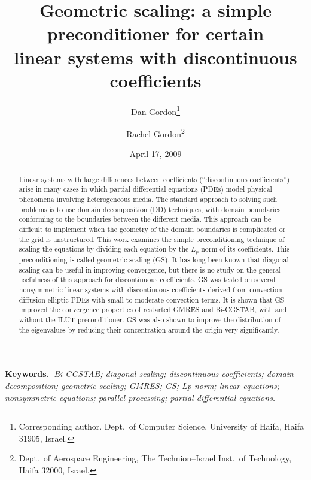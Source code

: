 \documentclass[12pt,a4paper]{article}
\newcommand{\keywords}[1]{{{\bf Keywords.~}{\em #1}}}
\newcounter{i}
\begin{document}
\baselineskip 14pt

\title{\vspace{-1.5cm}
\bf\Large
Geometric scaling: a simple preconditioner for certain\\
linear systems with discontinuous coefficients}

\author{Dan Gordon\thanks{Corresponding author. 
	Dept.\ of Computer Science,
        University of Haifa, Haifa 31905, Israel.
        \newline\hspace*{18pt}{\tt gordon@cs.haifa.ac.il}} 
	\and
        Rachel Gordon\thanks{Dept.\ of Aerospace Engineering,
        The Technion--Israel Inst.\ of Technology, Haifa 32000,
        Israel.\newline\hspace*{18pt}{\tt rgordon@tx.technion.ac.il}}}

\date{April 17, 2009}

\maketitle
\vspace{-1cm}
\begin{abstract}\noindent
Linear systems with large differences between coefficients 
(``discontinuous coefficients'') arise in many cases in which 
partial differential equations (PDEs) model physical phenomena 
involving heterogeneous media.  The standard approach to solving 
such problems is to use domain decomposition (DD) techniques, 
with domain boundaries conforming to the boundaries between the 
different media.  This approach can be difficult to implement 
when the geometry of the domain boundaries is complicated or 
the grid is unstructured.  This work examines the simple 
preconditioning technique of scaling the equations by dividing 
each equation by the $L_p$-norm of its coefficients.  This 
preconditioning is called geometric scaling (GS).  
It has long been known that diagonal scaling can be useful in 
improving convergence, but there is no study on the general 
usefulness of this approach for discontinuous coefficients.  
GS was tested on several nonsymmetric linear systems with 
discontinuous coefficients derived from convection-diffusion 
elliptic PDEs with small to moderate convection terms.
It is shown that GS improved the convergence properties of 
restarted GMRES and Bi-CGSTAB, with and without the ILUT 
preconditioner.
GS was also shown to improve the distribution of the 
eigenvalues by reducing their concentration around the 
origin very significantly.
\end{abstract}
\keywords{Bi-CGSTAB; diagonal scaling; discontinuous coefficients; 
domain decomposition; geometric scaling; GMRES; GS; Lp-norm; linear 
equations; nonsymmetric equations; parallel processing; partial 
differential equations.}
\end{document}
